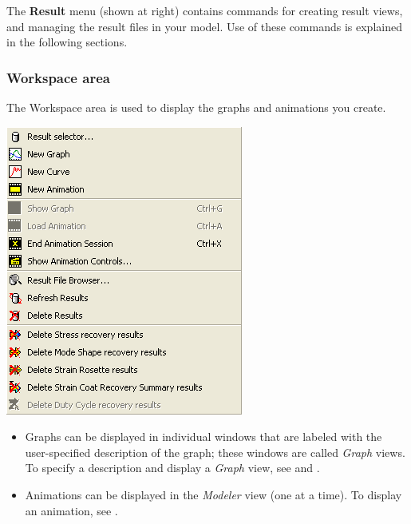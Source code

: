 \medskip\noindent
\begin{minipage}{0.5\textwidth}
  \raggedright

  The \textbf{Result} menu (shown at right) contains commands for creating
  result views, and managing the result files in your model.
  Use of these commands is explained in the following sections.

  \subsubsection{Workspace area}

  The Workspace area is used to display the graphs and animations you create.
\end{minipage}%
\hfill\begin{minipage}{0.47\textwidth}
  \includegraphics[width=\textwidth]{Figures/7-ResultMenu}
\end{minipage}

\begin{itemize}
\item
  Graphs can be displayed in individual windows that are labeled with the
  user-specified description of the graph; these windows are called {\sl Graph}
  views. To specify a description and display a {\sl Graph} view, see
   and
  .
\item
  Animations can be displayed in the {\sl Modeler} view (one at a time).
  To display an animation, see
  .
\end{itemize}


